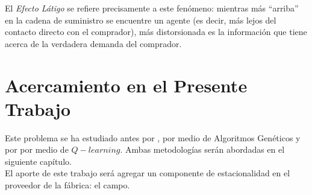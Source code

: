 El \textit{Efecto L\'atigo} se refiere precisamente a este fenómeno: mientras m\'as ``arriba'' en la cadena de suministro se encuentre un agente (es decir, m\'as lejos del contacto directo con el comprador), m\'as distorsionada es la informaci\'on que tiene acerca de la verdadera demanda del comprador.

\section{Acercamiento en el Presente Trabajo}

Este problema se ha estudiado antes por \citet{Strozzi}, por medio de Algoritmos Genéticos y por \citet{Chaharsooghi} por medio de $Q-learning$. Ambas metodolog\'ias ser\'an abordadas en el siguiente cap\'itulo.\\

El aporte de este trabajo será agregar un componente de estacionalidad en el proveedor de la f\'abrica: el campo.